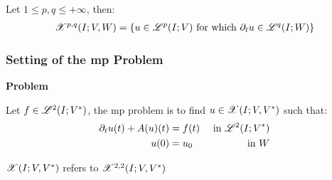 \begin{frame}
\begin{center}
        \begin{minipage}{0.75\textwidth}
            \begin{definition}
                Let $1 \leq p, q \leq +\infty$, then:
                \begin{align*}
                    \mathscr{X}^{p, q}(I; V, W) = \left\{ u \in \mathscr{L}^{p}(I; V) \text{ for which } \partial_t u \in \mathscr{L}^{q}(I; W) \right\}
                \end{align*}
            \end{definition}
        \end{minipage}
    \end{center}
    \vspace*{\fill}
    
\end{frame}

\begin{frame}
    \frametitle{Setting of the \acrfull{mp} Problem}

    \vspace*{\fill}
    \begin{center}
        {\color{\accentcolor} \Large \textbf{Problem}}
        \vspace*{0.25cm}

        \begin{minipage}{0.75\textwidth}
            \begin{definition}
                Let $f \in \mathscr{L}^{2}(I; V^*)$, the \acrshort{mp} problem is to find $u \in \mathscr{X}(I; V, V^*)$ such that:
                \begin{align*}
                        \partial_t u(t) + A(u)(t) &= f(t) & \text{ in } \mathscr{L}^{2}(I; V^*) \\
                        u(0) &= u_0 & \text{ in } W
                \end{align*}
            \end{definition}
        \end{minipage}
    \end{center}

    \vspace*{\fill}

    \begin{flushleft}
        \begin{minipage}{0.75\textwidth}
            {\footnotesize $\mathscr{X}(I; V, V^*)$ refers to $\mathscr{X}^{2, 2}(I; V, V^*)$ }
        \end{minipage}
    \end{flushleft}
    
\end{frame}


